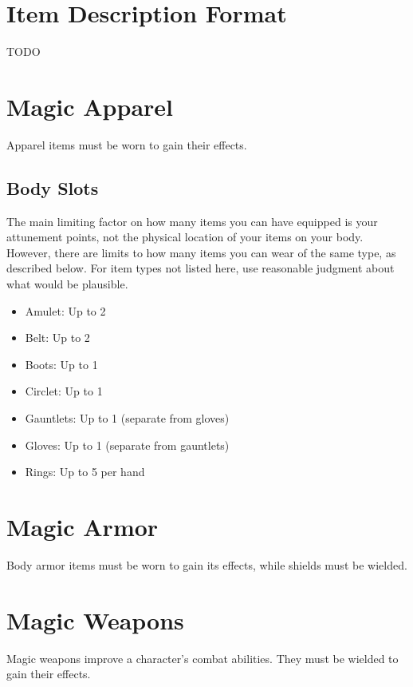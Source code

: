 \section{Item Description Format}
    TODO

\section{Magic Apparel}
    Apparel items must be worn to gain their effects.

    \subsection{Body Slots}
        The main limiting factor on how many items you can have equipped is your attunement points, not the physical location of your items on your body.
        However, there are limits to how many items you can wear of the same type, as described below.
        For item types not listed here, use reasonable judgment about what would be plausible.
        \begin{itemize}
            \item Amulet: Up to 2
            \item Belt: Up to 2
            \item Boots: Up to 1
            \item Circlet: Up to 1
            \item Gauntlets: Up to 1 (separate from gloves)
            \item Gloves: Up to 1 (separate from gauntlets)
            \item Rings: Up to 5 per hand
        \end{itemize}

    

    

\section{Magic Armor}
    Body armor items must be worn to gain its effects, while shields must be wielded.

    

    

\section{Magic Weapons} %
    Magic weapons improve a character's combat abilities.
    They must be wielded to gain their effects.

